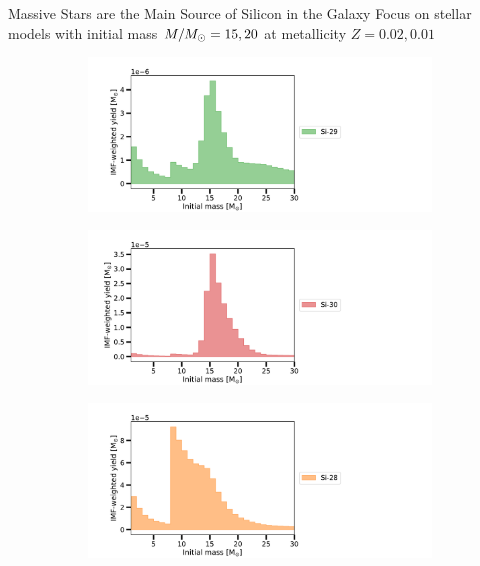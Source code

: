 \documentclass[10pt]{beamer}
\begin{document}
\begin{frame}{Massive Stars are the Main Source of Silicon in the Galaxy}
     Focus on stellar models with initial mass $M/M_\odot = 15, 20$ at metallicity $Z=0.02, 0.01$

    \begin{figure}
        \begin{subfigure}[b]{0.48\textwidth}
            \includegraphics[width=\textwidth]{figs/Si-29_Z=0.01_yield.pdf}
        \end{subfigure}
        \begin{subfigure}[b]{0.48\textwidth}
            \includegraphics[width=\textwidth]{figs/Si-30_Z=0.01_yield.pdf}
        \end{subfigure}
        \begin{subfigure}[b]{0.48\textwidth}
            \includegraphics[width=\textwidth]{figs/Si-28_Z=0.01_yield.pdf}

\end{subfigure}
\end{figure}
\end{frame}
\end{document}
